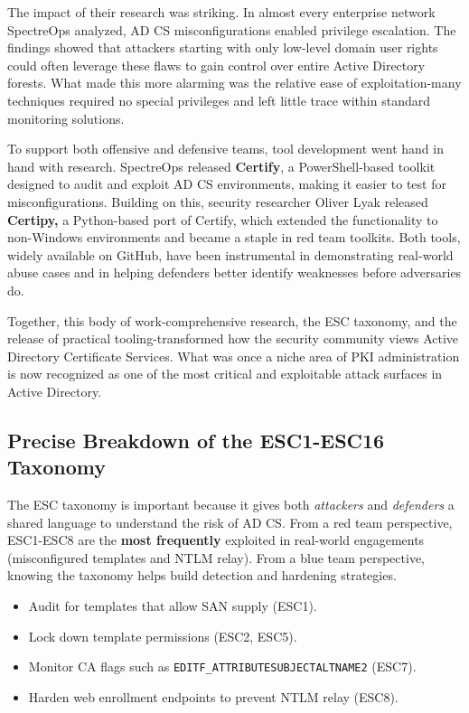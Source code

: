 {The impact of their research was striking. In almost every enterprise network SpectreOps analyzed, AD CS misconfigurations enabled privilege escalation. The findings showed that attackers starting with only low-level domain user rights could often leverage these flaws to gain control over entire Active Directory forests. What made this more alarming was the relative ease of exploitation-many techniques required no special privileges and left little trace within standard monitoring solutions.

To support both offensive and defensive teams, tool development went hand in hand with research. SpectreOps released \textbf{Certify}, a PowerShell-based toolkit designed to audit and exploit AD CS environments, making it easier to test for misconfigurations. Building on this, security researcher Oliver Lyak released \textbf{Certipy,} a Python-based port of Certify, which extended the functionality to non-Windows environments and became a staple in red team toolkits. Both tools, widely available on GitHub, have been instrumental in demonstrating real-world abuse cases and in helping defenders better identify weaknesses before adversaries do.

Together, this body of work-comprehensive research, the ESC taxonomy, and the release of practical tooling-transformed how the security community views Active Directory Certificate Services. What was once a niche area of PKI administration is now recognized as one of the most critical and exploitable attack surfaces in Active Directory.

\subsection{Precise Breakdown of the ESC1-ESC16 Taxonomy}
The ESC taxonomy is important because it gives both \textit{attackers} and \textit{defenders} a shared language to understand the risk of AD CS. From a red team perspective, ESC1-ESC8 are the \textbf{ most frequently} exploited in real-world engagements (misconfigured templates and NTLM relay). From a blue team perspective, knowing the taxonomy helps build detection and hardening strategies.
\begin{itemize}
    \item Audit for templates that allow SAN supply (ESC1).
    \item Lock down template permissions (ESC2, ESC5).
    \item Monitor CA flags such as \texttt{EDITF\_ATTRIBUTESUBJECTALTNAME2} (ESC7).
    \item Harden web enrollment endpoints to prevent NTLM relay (ESC8).
\end{itemize}

}

